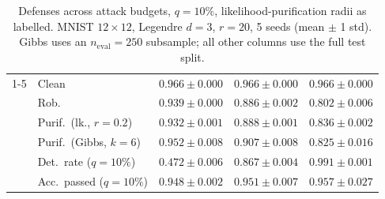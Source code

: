 \begin{table}[htbp]
\begin{tabular}{@{}llrrr@{}}
    \cmidrule(lr){1-5}
    \multirow{6}{*}{AT ($\alpha{=}0.01$)} & Clean & $0.966 \pm 0.000$ & $0.966 \pm 0.000$ & $0.966 \pm 0.000$ \\
     & Rob. & $0.939 \pm 0.000$ & $0.886 \pm 0.002$ & $0.802 \pm 0.006$ \\
     & Purif.\ (lk., $r{=}0.2$) & $0.932 \pm 0.001$ & $0.888 \pm 0.001$ & $0.836 \pm 0.002$ \\
     & Purif.\ (Gibbs, $k{=}6$) & $0.952 \pm 0.008$ & $0.907 \pm 0.008$ & $0.825 \pm 0.016$ \\
     & Det.\ rate ($q{=}10\%$) & $0.472 \pm 0.006$ & $0.867 \pm 0.004$ & $0.991 \pm 0.001$ \\
     & Acc.\ passed ($q{=}10\%$) & $0.948 \pm 0.002$ & $0.951 \pm 0.007$ & $0.957 \pm 0.027$ \\
    \bottomrule
  \end{tabular}
  \caption{Defenses across attack budgets, $q{=}10\%$, likelihood-purification radii as labelled. MNIST $12\times12$, Legendre $d{=}3$, $r{=}20$, 5 seeds (mean $\pm$ 1 std). Gibbs uses an $n_{\mathrm{eval}}=250$ subsample; all other columns use the full test split.}
  \label{tab:mnist_r12_models_r20}
\end{table}
